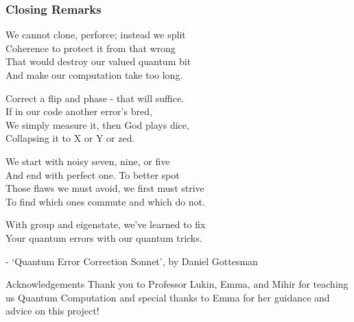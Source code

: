 \documentclass{beamer}
\begin{document}
\begin{frame}
    \frametitle{Closing Remarks}

    \begin{displayquote}
        \small
        We cannot clone, perforce; instead we split\\
        Coherence to protect it from that wrong\\
        That would destroy our valued quantum bit\\
        And make our computation take too long.\\
        \vspace{2mm}

        Correct a flip and phase - that will suffice.\\
        If in our code another error's bred, \\
        We simply measure it, then God plays dice,\\
        Collapsing it to X or Y or zed.\\
        \vspace{2mm}

        We start with noisy seven, nine, or five\\
        And end with perfect one. To better spot \\
        Those flaws we must avoid, we first must strive\\
        To find which ones commute and which do not.\\
        \vspace{2mm}

        With group and eigenstate, we've learned to fix\\
        Your quantum errors with our quantum tricks.
    \end{displayquote}
    \hspace{20mm}- `Quantum Error Correction Sonnet', by Daniel Gottesman
\end{frame}

\begin{frame}{Acknowledgements}
    Thank you to Professor Lukin, Emma, and Mihir for teaching us Quantum Computation and special thanks to Emma for her guidance and advice on this project! 
\end{frame}
\end{document}
